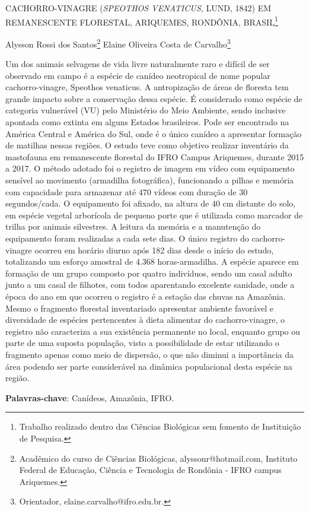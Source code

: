 \documentclass[article,12pt,onesidea,4paper,english,brazil]{abntex2}
\begin{document}
	
	
	\frenchspacing 
	
	\begin{center}
		\LARGE CACHORRO-VINAGRE \MakeUppercase{(\textit{Speothos venaticus,} Lund, 1842)} EM REMANESCENTE FLORESTAL, ARIQUEMES, RONDÔNIA, BRASIL\footnote{Trabalho realizado dentro das Ciências Biológicas sem fomento de Instituição de Pesquisa.}
		
		\normalsize
		Alysson Rossi dos Santos\footnote{Acadêmico do curso de Ciências Biológicas, alyssonr@hotmail.com, Instituto Federal de Educação, Ciência e Tecnologia de Rondônia - IFRO campus Ariquemes.} 
		Elaine Oliveira Costa de Carvalho\footnote{Orientador, elaine.carvalho@ifro.edu.br.} 
		
	\end{center}
	
	\noindent Um dos animais selvagens de vida livre naturalmente raro e difícil de ser observado em campo é a espécie de canídeo neotropical de nome popular cachorro-vinagre, Speothos venaticus. A antropização de áreas de floresta tem grande impacto sobre a conservação dessa espécie. É considerado como espécie de categoria vulnerável (VU) pelo Ministério do Meio Ambiente, sendo inclusive apontada como extinta em alguns Estados brasileiros. Pode ser encontrado na América Central e América do Sul, onde é o único canídeo a apresentar formação de matilhas nessas regiões. O estudo teve como objetivo realizar inventário da mastofauna em remanescente florestal do IFRO Campus Ariquemes, durante 2015 a 2017. O método adotado foi o registro de imagem em vídeo com equipamento sensível ao movimento (armadilha fotográfica), funcionando a pilhas e memória com capacidade para armazenar até 470 vídeos com duração de 30 segundos/cada. O equipamento foi afixado, na altura de 40 cm distante do solo, em espécie vegetal arborícola de pequeno porte que é utilizada como marcador de trilha por animais silvestres. A leitura da memória e a manutenção do equipamento foram realizadas a cada sete dias. O único registro do cachorro-vinagre ocorreu em horário diurno após 182 dias desde o início do estudo, totalizando um esforço amostral de 4.368 horas-armadilha. A espécie aparece em formação de um grupo composto por quatro indivíduos, sendo um casal adulto junto a um casal de filhotes, com todos aparentando excelente sanidade, onde a época do ano em que ocorreu o registro é a estação das chuvas na Amazônia. Mesmo o fragmento florestal inventariado apresentar ambiente favorável e diversidade de espécies pertencentes à dieta alimentar do cachorro-vinagre, o registro não caracteriza a sua existência permanente no local, enquanto grupo ou parte de uma suposta população, visto a possibilidade de estar utilizando o fragmento apenas como meio de dispersão, o que não diminui a importância da área podendo ser parte considerável na dinâmica populacional desta espécie na região.
	
	\vspace{\onelineskip}
	
	\noindent
	\textbf{Palavras-chave}: Canídeos, Amazônia, IFRO.
	
\end{document}
